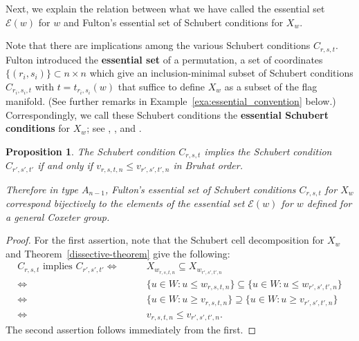 \documentclass[12pt,dvips]{amsart}
\theoremstyle{plain}
\newtheorem{proposition}[theorem]{Proposition}
\theoremstyle{definition}
\theoremstyle{remark}
\numberwithin{equation}{section}
\def\Ess{{\mathcal{E}}}
\begin{document}
Next, we explain the relation between what we have called the essential set $\Ess(w)$
for $w$ and Fulton's essential set of Schubert conditions for $X_w$.

Note that there are implications among the various Schubert conditions $C_{r,s,t}$.
Fulton introduced the {\bf essential set} of a permutation, a set of coordinates 
$\{(r_i,s_i)\}\subset n\times n$ which give an inclusion-minimal subset of 
Schubert conditions $C_{r_i,s_i,t}$ with $t=t_{r_i,s_i}(w)$ that suffice to define
$X_w$ as a subset of the flag manifold. (See further remarks in Example~\ref{exa:essential_convention}
below.) Correspondingly, we call these Schubert conditions the
{\bf essential Schubert conditions} for
$X_w$; see \cite[\S3]{Fulton}, \cite[pp. 20-21]{FultonPragacz}, and
\cite[\S2]{ErikssonLinusson}.

\begin{proposition}
\label{essential-proposition}
The Schubert condition $C_{r,s,t}$ implies the Schubert condition $C_{r',s',t'}$
if and only if  $v_{r,s,t,n} \leq v_{r',s',t',n}$ in Bruhat order.

Therefore in type $A_{n-1}$, Fulton's essential set of Schubert conditions $C_{r,s,t}$ for $X_w$ 
correspond bijectively to the elements of the essential set $\Ess(w)$ for $w$ defined for a general
Coxeter group.
\end{proposition}
\begin{proof}
For the first assertion, note that the Schubert cell decomposition for $X_w$ and
Theorem~\ref{dissective-theorem} give the following:
$$
\begin{aligned}
 C_{r,s,t} \text{ implies }C_{r',s',t'} 
 \Leftrightarrow& \qquad X_{w_{r,s,t,n}} \subseteq X_{w_{r',s',t',n}} \\
 \Leftrightarrow& \qquad \{u \in W: u \leq w_{r,s,t,n}  \} 
                               \subseteq \{u \in W: u \leq w_{r',s',t',n}\}\\
 \Leftrightarrow& \qquad \{u \in W: u \geq v_{r,s,t,n}  \} 
                               \supseteq \{u \in W: u \geq v_{r',s',t',n}\}\\
 \Leftrightarrow& \qquad v_{r,s,t,n} \leq v_{r',s',t',n}.
\end{aligned}
$$
The second assertion follows immediately from the first.
\end{proof}
\end{document}
